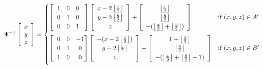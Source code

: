 \documentclass[]{article}
\begin{document}
\begin{equation}
	\Psi^{-1}\left[\begin{array}{c}
		x\\y\\z
	\end{array}\right] 
	= 
	\begin{cases}
		\left[ \hspace{2mm} \begin{matrix}
			1 & 0 & 0 \\
			0 & 1 & 0 \\
			0 & 0 & 1
		\end{matrix}\hspace{3mm}\right]
	
		\left[\begin{array}{c}
		x - 2\left\lfloor \frac{x}{2} \right\rfloor
		\\ y- 2\left\lfloor \frac{y}{2} \right\rfloor
		\\ z
		\end{array} \right]
		+
		\left[\begin{array}{c}
			\left\lfloor \frac{x}{2} \right\rfloor
			\\ \left\lfloor \frac{y}{2} \right\rfloor
			\\ -(\left\lfloor \frac{x}{2} \right\rfloor + \left\lfloor \frac{y}{2} \right\rfloor )
		\end{array} \right]
			& \text{if } (x,y,z)\in A'	\vspace{2mm}
		\\
		\left[ \hspace{2mm} \begin{matrix}
			0 & 0 & -1 \\
			0 & 1 & 0 \\
			1 & 0 & 0
		\end{matrix}\hspace{0mm}\right]
	
		\left[\begin{array}{c}
		-(x - 2\left\lfloor \frac{x}{2} \right\rfloor)
		\\ y- 2\left\lfloor \frac{y}{2} \right\rfloor
		\\ z
		\end{array} \right]
		+
		\left[\begin{array}{c}
			1+\left\lfloor \frac{x}{2} \right\rfloor
			\\ \left\lfloor \frac{y}{2} \right\rfloor
			\\ -(\left\lfloor \frac{x}{2} \right\rfloor + \left\lfloor \frac{y}{2} \right\rfloor -1)
		\end{array} \right]
			& \text{if } (x,y,z)\in B'	\vspace{2mm}


\end{cases}
\end{equation}
\end{document}

